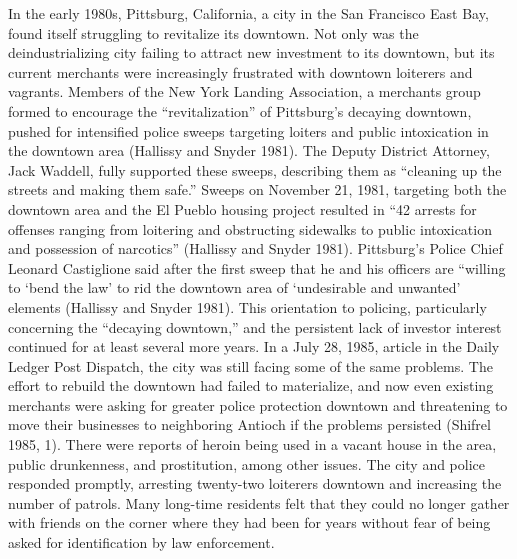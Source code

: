 \documentclass[12pt]{article}
\begin{document}
In the early 1980s, Pittsburg, California, a city in the San Francisco East Bay, found itself struggling to revitalize its downtown. Not only was the deindustrializing city failing to attract new investment to its downtown, but its current merchants were increasingly frustrated with downtown loiterers and vagrants. Members of the New York Landing Association, a merchants group formed to encourage the “revitalization” of Pittsburg’s decaying downtown, pushed for intensified police sweeps targeting loiters and public intoxication in the downtown area (Hallissy and Snyder 1981). The Deputy District Attorney, Jack Waddell, fully supported these sweeps, describing them as “cleaning up the streets and making them safe.” Sweeps on November 21, 1981, targeting both the downtown area and the El Pueblo housing project resulted in “42 arrests for offenses ranging from loitering and obstructing sidewalks to public intoxication and possession of narcotics” (Hallissy and Snyder 1981). Pittsburg’s Police Chief Leonard Castiglione said after the first sweep that he and his officers are “willing to ‘bend the law’ to rid the downtown area of ‘undesirable and unwanted’ elements (Hallissy and Snyder 1981). This orientation to policing, particularly concerning the “decaying downtown,” and the persistent lack of investor interest continued for at least several more years. In a July 28, 1985, article in the Daily Ledger Post Dispatch, the city was still facing some of the same problems. The effort to rebuild the downtown had failed to materialize, and now even existing merchants were asking for greater police protection downtown and threatening to move their businesses to neighboring Antioch if the problems persisted (Shifrel 1985, 1). There were reports of heroin being used in a vacant house in the area, public drunkenness, and prostitution, among other issues. The city and police responded promptly, arresting twenty-two loiterers downtown and increasing the number of patrols. Many long-time residents felt that they could no longer gather with friends on the corner where they had been for years without fear of being asked for identification by law enforcement.
\end{document}
